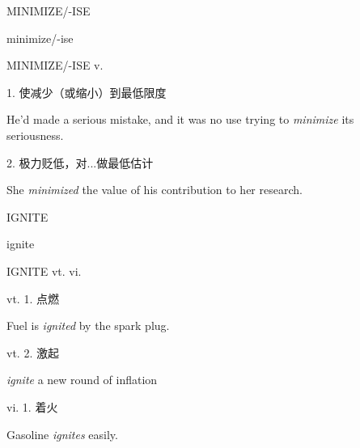 \begin{flashcard}{
MINIMIZE/-ISE

minimize/-ise
}
\begin{center}
MINIMIZE/-ISE v. 
\end{center}
1. 使减少（或缩小）到最低限度

He'd made a serious mistake, and it was no use trying to \textit{minimize} its seriousness.

2. 极力贬低，对...做最低估计

She \textit{minimized} the value of his contribution to her research.

\end{flashcard}
\begin{flashcard}{
IGNITE

ignite
}
\begin{center}
IGNITE vt. vi. 
\end{center}
vt. 1. 点燃

Fuel is \textit{ignited} by the spark plug.

vt. 2. 激起

\textit{ignite} a new round of inflation

vi. 1. 着火

Gasoline \textit{ignites} easily.

\end{flashcard}
